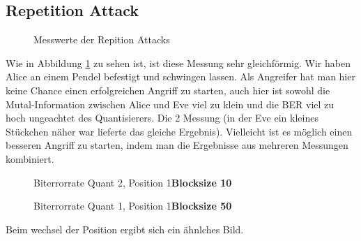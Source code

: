 \documentclass[12pt,a4paper]{article}
\begin{document}
\subsection*{Repetition Attack}
\begin{figure}[H]
\centering

 \qquad
{}  
\caption{Messwerte der Repition Attacks}
\label{fig:9}
\end{figure}
Wie in Abbildung \ref{fig:9} zu sehen ist, ist diese Messung sehr gleichförmig. Wir haben Alice an einem Pendel befestigt und schwingen lassen. Als Angreifer hat man hier keine Chance einen erfolgreichen Angriff zu starten, auch hier ist sowohl die Mutal-Information zwischen Alice und Eve viel zu klein und die BER viel zu hoch ungeachtet des Quantisierers. Die 2 Messung (in der Eve ein kleines Stückchen näher war lieferte das gleiche Ergebnis). Vielleicht ist es möglich einen besseren Angriff zu starten, indem man die Ergebnisse aus mehreren Messungen kombiniert. 
\begin{figure}[H]
\centering
{} \qquad
{}  
\caption{Biterrorrate Quant 2, Position 1\textbf{Blocksize 10}}
\label{fig:10}
\end{figure}
\begin{figure}[H]
\centering
{} \qquad
{}  
\caption{Biterrorrate Quant 1, Position 1\textbf{Blocksize 50}}
\label{fig:11}
\end{figure}
Beim wechsel der Position ergibt sich ein ähnlches Bild.
\end{document}
